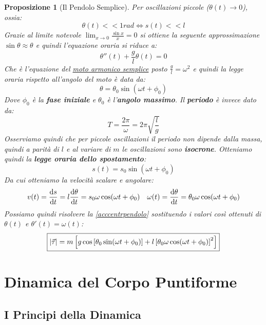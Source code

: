 \documentclass{article}
\newtheorem{prop}[defn]{Proposizione}
\begin{document}
\begin{prop}[Il Pendolo Semplice]
    Per oscillazioni piccole ($\theta(t)\to 0$), ossia:
    \[\theta(t)<<1 rad\iff s(t)<<l\]
    Grazie al limite notevole $\lim_{x\to 0}\frac{\sin x}{x}=0$ si ottiene la seguente approssimazione $\sin\theta\approx\theta$ e quindi l'equazione oraria si riduce a:
    \[\theta''(t)+\frac{g}{l}\theta(t)=0\]
    Che è l'equazione del \hyperlink{armonicosemplice}{moto armonico semplice} posto $\frac{g}{l}=\omega^2$ e quindi la legge oraria rispetto all'angolo del moto è data da:
    \begin{equation}
    \label{leggeangpendolo}
        \theta=\theta_0\sin(\omega t+\phi_0)
    \end{equation}
    Dove $\phi_0$ è la \textbf{fase iniziale} e $\theta_0$ è l'\textbf{angolo massimo}. Il \textbf{periodo} è invece dato da:
    \begin{equation}
    \label{periodopendolo}
    \boxed{T=\frac{2\pi}{\omega}=2\pi\sqrt{\frac{l}{g}}}
    \end{equation}
    Osserviamo quindi che per piccole oscillazioni il periodo non dipende dalla massa, quindi a parità di $l$ e al variare di $m$ le oscillazioni sono \textbf{isocrone}.
    Otteniamo quindi la \textbf{legge oraria dello spostamento}:
    \begin{equation}
        \boxed{s(t)=s_0\sin(\omega t+\phi_0)}
    \end{equation}
    Da cui otteniamo la velocità scalare e angolare:
    \begin{equation}
        v(t)=\dv{s}{t}=l\dv{\theta}{t}=s_0\omega\cos(\omega t+\phi_0)\quad
        \omega(t)=\dv{\theta}{t}=\theta_0\omega\cos(\omega t+\phi_0)
    \end{equation}
    Possiamo quindi risolvere la \ref{acccentrpendolo} sostituendo i valori così ottenuti di $\theta(t)$ e $\theta'(t)=\omega(t)$:
    \begin{equation}
        \boxed{|\va{\tau}|=m\left[g\cos\left[\theta_0\sin(\omega t+\phi_0)\right]+l\left[\theta_0\omega\cos(\omega t+\phi_0)\right]^2\right]}
    \end{equation}
\end{prop}

\section{Dinamica del Corpo Puntiforme}

\subsection{I Principi della Dinamica}
\end{document}
